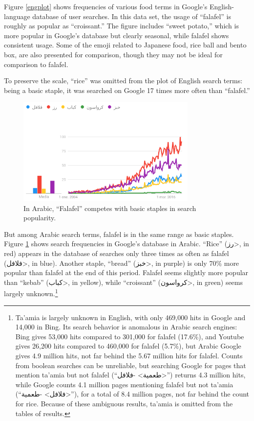 \documentclass[a4paper,10pt]{article}
\begin{document}
Figure \ref{engplot} shows frequencies of various food terms in Google's English-language
database of user searches.  In this data set, the usage of ``falafel'' is roughly as popular as
``croissant.'' 
The figure includes ``sweet potato,'' which is more popular
in Google's database but clearly seasonal, while falafel shows consistent usage.
Some of the emoji related to Japanese food, {\sc rice ball} and {\sc bento box}, are also
presented for comparison, though they may not be ideal for comparison to falafel.

To preserve the scale, ``rice'' was omitted from the plot of English search terms:
being a basic staple, it was searched on Google 17 times more often than ``falafel.''

\begin{figure}
\begin{center}
\includegraphics[width=3.5in]{atrends.png}
\end{center}
\caption{In Arabic, ``Falafel'' competes with basic staples in search popularity.}
\label{aplot}
\end{figure}

But among Arabic search terms, falafel is in the same range as basic staples. 
Figure \ref{aplot} shows search frequencies in Google's database in Arabic.
``Rice'' (\<رز>, in red) appears in the database of searches only three times as often as
falafel (\<فلافل>, in blue).  Another staple, ``bread'' (\<خبز>, in purple) is only 70\% more
popular than falafel at the end of this period. Falafel seems slightly more popular than ``kebab'' (\<كباب>,
in yellow), while ``croissant'' (\<كرواسون>, in green) seems largely unknown.\footnote{
Ta'amia is largely unknown in English, with only 469,000 hits in Google and 14,000 in Bing.
Its search behavior is anomalous in Arabic search engines: Bing gives 53,000 hits compared
to 301,000 for falafel (17.6\%), and Youtube gives 26,200 hits compared to 460,000 for falafel (5.7\%), but
Arabic Google gives 4.9 million hits, not far behind the 5.67 million hits for falafel.
Counts from boolean searches can be unreliable, but searching Google for pages that mention ta'amia but not falafel
(``\<طعمية> -\<فلافل>'')
returns 4.3 million hits, while Google counts 4.1 million pages mentioning falafel but not ta'amia
(``\<فلافل> -\<طعمية>''), for a total of 8.4 million pages, not far behind the count for rice.
Because of these ambiguous results, ta'amia is omitted from the tables of results.
}
\end{document}
